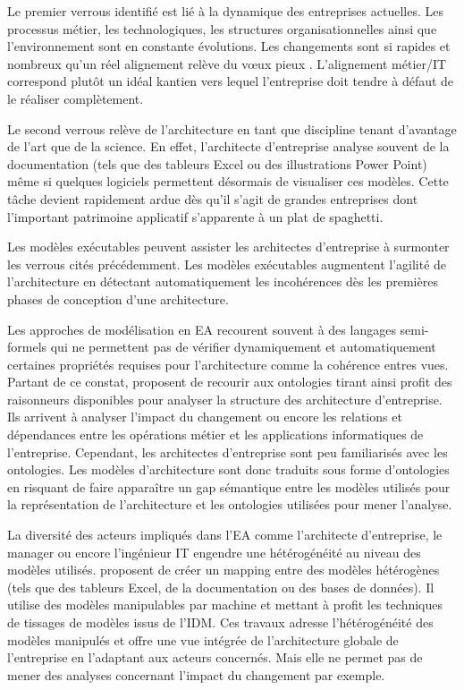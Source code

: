 Le premier verrous identifié est lié à la dynamique des entreprises actuelles.
Les processus métier, les technologiques, les structures organisationnelles
ainsi que l'environnement sont en constante évolutions. Les changements sont si
rapides et nombreux qu'un réel alignement relève du vœux pieux
\cite{lankhorst2013enterprise}. L'alignement métier/IT correspond plutôt un
idéal kantien vers lequel l'entreprise doit tendre à défaut de le réaliser
complètement.
	
Le second verrous relève de l'architecture en tant que discipline tenant
d'avantage de l'art que de la science. En effet, l'architecte d'entreprise
analyse souvent de la documentation (tels que des tableurs Excel ou des
illustrations Power Point) même si quelques logiciels permettent désormais de
visualiser ces modèles. Cette tâche devient rapidement ardue dès qu'il s'agit
de grandes entreprises dont l'important patrimoine applicatif s'apparente à un
plat de spaghetti.
	
Les modèles exécutables peuvent assister les architectes d'entreprise à
surmonter les verrous cités précédemment. Les modèles exécutables augmentent
l'agilité de l'architecture en détectant automatiquement les incohérences dès
les premières phases de conception d'une architecture. 
	
Les approches de modélisation en EA recourent souvent à des langages
semi-formels qui ne permettent pas de vérifier dynamiquement et automatiquement
certaines propriétés requises pour l'architecture comme la cohérence entres
vues. Partant de ce constat, \cite{sunkle_analyzing_2013} proposent de recourir
aux ontologies tirant ainsi profit des raisonneurs disponibles pour analyser la
structure des architecture d'entreprise. Ils arrivent à analyser l'impact du
changement ou encore les relations et dépendances entre les opérations métier
et les applications informatiques de l'entreprise. Cependant, les architectes
d'entreprise sont peu familiarisés avec les ontologies. Les modèles
d'architecture sont donc traduits sous forme d'ontologies en risquant de faire
apparaître un gap sémantique entre les modèles utilisés pour la représentation
de l'architecture et les ontologies utilisées pour mener l'analyse.
	
La diversité des acteurs impliqués dans l'EA comme l'architecte d'entreprise,
le manager ou encore l'ingénieur IT engendre une hétérogénéité au niveau des
modèles utilisés. \cite{bruneliere2013support} proposent de créer un mapping
entre des modèles hétérogènes (tels que des tableurs Excel, de la documentation
ou des bases de données). Il utilise des modèles manipulables par machine et
mettant à profit les techniques de tissages de modèles issus de l'IDM. Ces
travaux adresse l'hétérogénéité des modèles manipulés et offre une vue intégrée
de l'architecture globale de l'entreprise en l'adaptant aux acteurs concernés.
Mais elle ne permet pas de mener des analyses concernant l'impact du changement
par exemple. 

